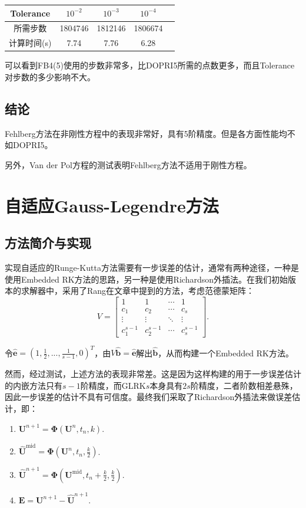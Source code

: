 \documentclass[lang=cn,10pt,bibend=bibtex]{elegantbook}
\begin{document}
\begin{table}[H]
  \centering
  \begin{tabular}{c|cccc}
    Tolerance & $10^{-2}$ & $10^{-3}$ & $10^{-4}$ \\ \hline
    所需步数 & 1804746 & 1812146 & 1806674   \\
    计算时间(s) & 7.74  & 7.76  & 6.28  
  \end{tabular}
\end{table}

可以看到FB4(5)使用的步数非常多，比DOPRI5所需的点数更多，而且Tolerance对步数的多少影响不大。

\subsection{结论}

Fehlberg方法在非刚性方程中的表现非常好，具有5阶精度。但是各方面性能均不如DOPRI5。

另外，Van der Pol方程的测试表明Fehlberg方法不适用于刚性方程。

\section{自适应Gauss-Legendre方法}

\subsection{方法简介与实现}

实现自适应的Runge-Kutta方法需要有一步误差的估计，通常有两种途径，一种是使用Embedded RK方法的思路，另一种是使用Richardson外插法。在我们初始版本的求解器中，采用了Rang在文章\cite{rang2014apdative}中提到的方法，考虑范德蒙矩阵：
\begin{equation*}
  V=\begin{bmatrix}
    1 & 1 & \cdots & 1\\
    c_1 & c_2 & \cdots & c_s\\
    \vdots & \vdots & \ddots & \vdots \\
    c_1^{s-1} & c_2^{s-1} & \cdots & c_s^{s-1}
  \end{bmatrix}.
\end{equation*}

令$\hat{\mathbf{e}}=\left(1,\frac{1}{2},...,\frac{1}{s-1},0\right)^T$，由$V\hat{\mathbf{b}}=\hat{\mathbf{e}}$解出$\hat{\mathbf{b}}$，从而构建一个Embedded RK方法。

然而，经过测试，上述方法的表现非常差。这是因为这样构建的用于一步误差估计的内嵌方法只有$s-1$阶精度，而GLRK$s$本身具有$2s$阶精度，二者阶数相差悬殊，因此一步误差的估计不具有可信度。最终我们采取了Richardson外插法来做误差估计，即：
\begin{enumerate}[itemindent=1em]
  \item $\mathbf{U}^{n+1}=\mathbf{\Phi}(\mathbf{U}^{n},t_n,k)$.
  \item $\hat{\mathbf{U}}^{\text{mid}}=\mathbf{\Phi}(\mathbf{U}^{n},t_n,\frac{k}{2})$.
  \item $\hat{\mathbf{U}}^{n+1}=\mathbf{\Phi}(\mathbf{U}^{\text{mid}},t_n+\frac{k}{2},\frac{k}{2})$.
  \item $\mathbf{E}=\mathbf{U}^{n+1}-\hat{\mathbf{U}}^{n+1}$.
\end{enumerate}
\end{document}
